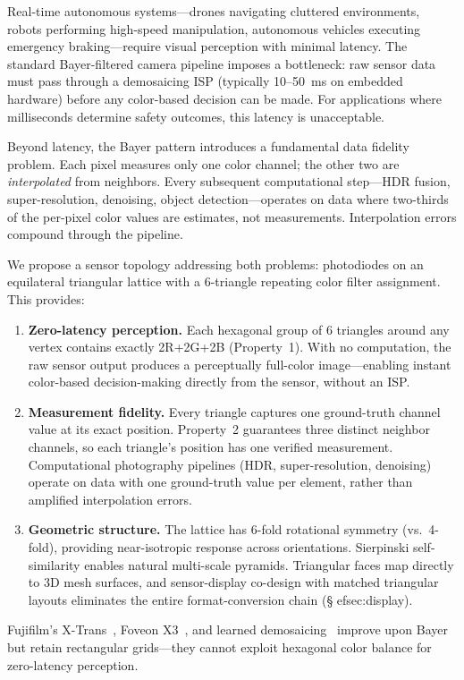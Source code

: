 \documentclass[10pt,twocolumn,letterpaper]{article}
\begin{document}
Real-time autonomous systems---drones navigating cluttered environments, robots performing high-speed manipulation, autonomous vehicles executing emergency braking---require visual perception with minimal latency. The standard Bayer-filtered camera pipeline imposes a bottleneck: raw sensor data must pass through a demosaicing ISP (typically 10--50~ms on embedded hardware) before any color-based decision can be made. For applications where milliseconds determine safety outcomes, this latency is unacceptable.

Beyond latency, the Bayer pattern introduces a fundamental data fidelity problem. Each pixel measures only one color channel; the other two are \emph{interpolated} from neighbors. Every subsequent computational step---HDR fusion, super-resolution, denoising, object detection---operates on data where two-thirds of the per-pixel color values are estimates, not measurements. Interpolation errors compound through the pipeline.

We propose a sensor topology addressing both problems: photodiodes on an equilateral triangular lattice with a 6-triangle repeating color filter assignment. This provides:
\begin{enumerate}[nosep]
\item \textbf{Zero-latency perception.} Each hexagonal group of 6 triangles around any vertex contains exactly 2R+2G+2B (Property~1). With no computation, the raw sensor output produces a perceptually full-color image---enabling instant color-based decision-making directly from the sensor, without an ISP.
\item \textbf{Measurement fidelity.} Every triangle captures one ground-truth channel value at its exact position. Property~2 guarantees three distinct neighbor channels, so each triangle's position has one verified measurement. Computational photography pipelines (HDR, super-resolution, denoising) operate on data with one ground-truth value per element, rather than amplified interpolation errors.
\item \textbf{Geometric structure.} The lattice has 6-fold rotational symmetry (vs.\ 4-fold), providing near-isotropic response across orientations. Sierpinski self-similarity enables natural multi-scale pyramids. Triangular faces map directly to 3D mesh surfaces, and sensor-display co-design with matched triangular layouts eliminates the entire format-conversion chain (\S
ef{sec:display}).
\end{enumerate}

Fujifilm's X-Trans~\cite{fujifilm2012}, Foveon X3~\cite{hubel2004}, and learned demosaicing~\cite{gharbi2016} improve upon Bayer but retain rectangular grids---they cannot exploit hexagonal color balance for zero-latency perception.
\end{document}
